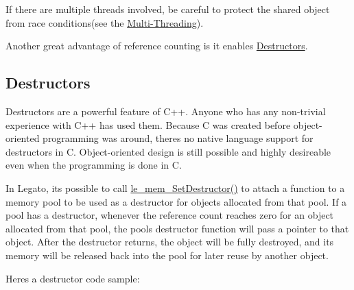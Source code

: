 If there are multiple threads involved, be careful to protect the shared object from race conditions(see the \hyperlink{c_memory_mem_threading}{Multi-\/\+Threading}).

Another great advantage of reference counting is it enables \hyperlink{c_memory_mem_destructors}{Destructors}.\hypertarget{c_memory_mem_destructors}{}\subsection{Destructors}\label{c_memory_mem_destructors}
Destructors are a powerful feature of C++. Anyone who has any non-\/trivial experience with C++ has used them. Because C was created before object-\/oriented programming was around, there\textquotesingle{}s no native language support for destructors in C. Object-\/oriented design is still possible and highly desireable even when the programming is done in C.

In Legato, it\textquotesingle{}s possible to call {\ttfamily \hyperlink{le__mem_8h_a055007b38ce04bcb823e08034fd11b85}{le\+\_\+mem\+\_\+\+Set\+Destructor()}} to attach a function to a memory pool to be used as a destructor for objects allocated from that pool. If a pool has a destructor, whenever the reference count reaches zero for an object allocated from that pool, the pool\textquotesingle{}s destructor function will pass a pointer to that object. After the destructor returns, the object will be fully destroyed, and its memory will be released back into the pool for later reuse by another object.

Here\textquotesingle{}s a destructor code sample\+: 


